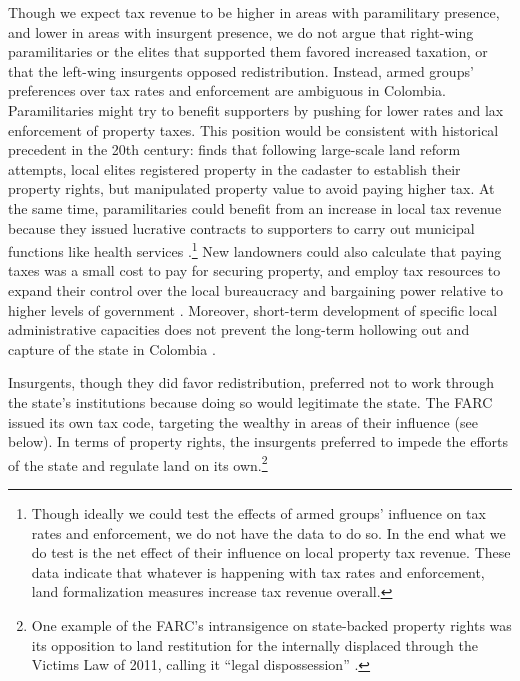 Though we expect tax revenue to be higher in areas with paramilitary presence, and lower in areas with insurgent presence, we do not argue that right-wing paramilitaries or the elites that supported them favored increased taxation, or that the left-wing insurgents opposed redistribution. Instead, armed groups' preferences over tax rates and enforcement are ambiguous in Colombia. Paramilitaries might try to benefit supporters by pushing for lower rates and lax enforcement of property taxes. This position would be consistent with historical precedent in the 20th century: \citet{sanchez-talanquer18a} finds that following large-scale land reform attempts, local elites registered property in the cadaster to establish their property rights, but manipulated property value to avoid paying higher tax. At the same time, paramilitaries could benefit from an increase in local tax revenue because they issued lucrative contracts to supporters to carry out municipal functions like health services \citep{eaton06a, verdad-abierta15b}.\footnote{Though ideally we could test the effects of armed groups' influence on tax rates and enforcement, we do not have the data to do so. In the end what we do test is the net effect of their influence on local property tax revenue. These data indicate that whatever is happening with tax rates and enforcement, land formalization measures increase tax revenue overall.} New landowners could also calculate that paying taxes was a small cost to pay for securing property, and employ tax resources to expand their control over the local bureaucracy and bargaining power relative to higher levels of government \citep{sanchez-talanquer18a,pardelli2018}. Moreover, short-term development of specific local administrative capacities does not prevent the long-term hollowing out and capture of the state in Colombia \citep{stasavage2014}. 

Insurgents, though they did favor redistribution, preferred not to work through the state's institutions because doing so would legitimate the state. The FARC issued its own tax code, targeting the wealthy in areas of their influence (see below). In terms of property rights, the insurgents preferred to impede the efforts of the state \citep{bernal-morales14a} and regulate land on its own.\footnote{One example of the FARC's intransigence on state-backed property rights was its opposition to land restitution for the internally displaced through the Victims Law of 2011, calling it ``legal dispossession'' \citep{bernal-morales14a}.}  

